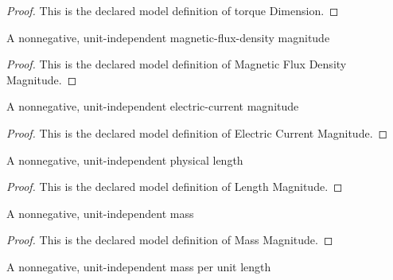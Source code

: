\begin{proof}
  This is the declared model definition of torque Dimension.
\end{proof}
\begin{definition}
  \label{def:physics:phyx-mini-0948:phyxminiproblems-problemphyxmini0948-magneticfluxdensitymagnitude}
  A nonnegative, unit-independent magnetic-flux-density magnitude
\end{definition}
\begin{proof}
  This is the declared model definition of Magnetic Flux Density Magnitude.
\end{proof}
\begin{definition}
  \label{def:physics:phyx-mini-0948:phyxminiproblems-problemphyxmini0948-electriccurrentmagnitude}
  A nonnegative, unit-independent electric-current magnitude
\end{definition}
\begin{proof}
  This is the declared model definition of Electric Current Magnitude.
\end{proof}
\begin{definition}
  \label{def:physics:phyx-mini-0948:phyxminiproblems-problemphyxmini0948-lengthmagnitude}
  A nonnegative, unit-independent physical length
\end{definition}
\begin{proof}
  This is the declared model definition of Length Magnitude.
\end{proof}
\begin{definition}
  \label{def:physics:phyx-mini-0948:phyxminiproblems-problemphyxmini0948-massmagnitude}
  A nonnegative, unit-independent mass
\end{definition}
\begin{proof}
  This is the declared model definition of Mass Magnitude.
\end{proof}
\begin{definition}
  \label{def:physics:phyx-mini-0948:phyxminiproblems-problemphyxmini0948-linearmassdensitymagnitude}
  A nonnegative, unit-independent mass per unit length
\end{definition}
